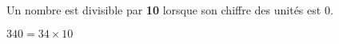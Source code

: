 \begin{pageCours}
\begin{Pp}
Un nombre est divisible par \textbf{10} lorsque son chiffre des unités est 0.
\end{Pp}

\begin{Ex}
$340=34\times10$
\end{Ex}



% 

\end{pageCours} 
